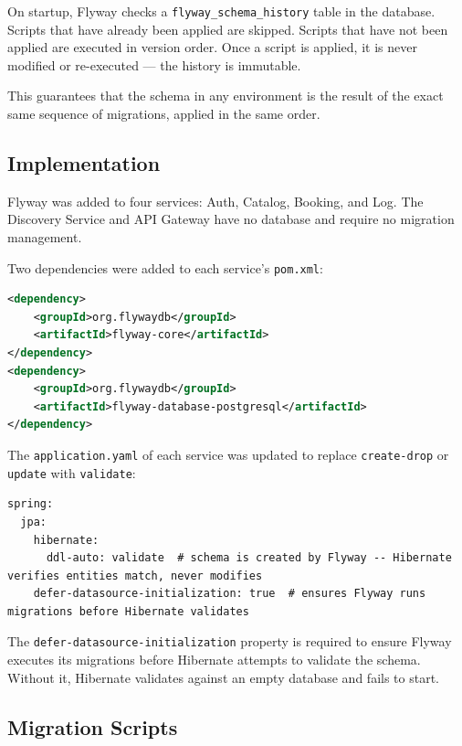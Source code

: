 On startup, Flyway checks a \texttt{flyway\_schema\_history} table in the database. Scripts that have already been applied are skipped. Scripts that have not been applied are executed in version order. Once a script is applied, it is never modified or re-executed --- the history is immutable.

This guarantees that the schema in any environment is the result of the exact same sequence of migrations, applied in the same order.

\subsection{Implementation}

Flyway was added to four services: Auth, Catalog, Booking, and Log. The Discovery Service and API Gateway have no database and require no migration management.

Two dependencies were added to each service's \texttt{pom.xml}:

\begin{lstlisting}[style=javastyle, language=XML, caption={Flyway dependencies}]
<dependency>
    <groupId>org.flywaydb</groupId>
    <artifactId>flyway-core</artifactId>
</dependency>
<dependency>
    <groupId>org.flywaydb</groupId>
    <artifactId>flyway-database-postgresql</artifactId>
</dependency>
\end{lstlisting}

The \texttt{application.yaml} of each service was updated to replace \texttt{create-drop} or \texttt{update} with \texttt{validate}:

\begin{lstlisting}[style=yamlstyle, caption={Hibernate configuration after Flyway migration}]
spring:
  jpa:
    hibernate:
      ddl-auto: validate  # schema is created by Flyway -- Hibernate verifies entities match, never modifies
    defer-datasource-initialization: true  # ensures Flyway runs migrations before Hibernate validates
\end{lstlisting}

The \texttt{defer-datasource-initialization} property is required to ensure Flyway executes its migrations before Hibernate attempts to validate the schema. Without it, Hibernate validates against an empty database and fails to start.

\subsection{Migration Scripts}

